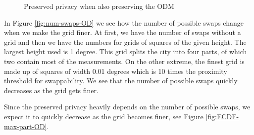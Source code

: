 \documentclass[times,twocolumn,final,authoryear]{elsarticle}
\begin{document}
\begin{figure}
\centering
  \caption{Preserved privacy when also preserving the ODM}
  \label{fig:OD}
\end{figure}

In Figure \ref{fig:num-swaps-OD} we see how the number of possible
swaps change when we make the grid finer. At first, we have the number
of swaps without a grid and then we have the numbers for grids of
squares of the given height. The largest height used is 1 degree.
This grid splits the city into four parts, of which two contain
most of the measurements. On the other extreme, the finest grid is made up of squares of width 0.01 degrees which is 10 times the proximity threshold for swappability.  
We see that the number of possible swaps quickly decreases as the grid
gets finer. 

Since the preserved privacy heavily depends on the number of possible
swaps, we expect it to quickly decrease as the grid becomes finer, see Figure
\ref{fig:ECDF-max-part-OD}. 
\end{document}
